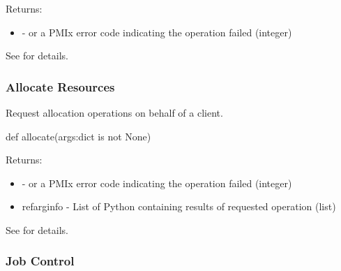 Returns:
\begin{itemize}
    \item {} -  or a \ac{PMIx} error code indicating the operation failed (integer)
\end{itemize}

See  for details.


\subsubsection{Allocate Resources}

\summary

Request allocation operations on behalf of a client.

\format

\pyspecificstart
\begin{codepar}
def allocate(args:dict is not None)
\end{codepar}
\pyspecificend

\begin{arglist}
\end{arglist}

Returns:
\begin{itemize}
    \item {} -  or a \ac{PMIx} error code indicating the operation failed (integer)
    \item refarg{info} - List of Python  containing results of requested operation (list)
\end{itemize}

See  for details.


\subsubsection{Job Control}

